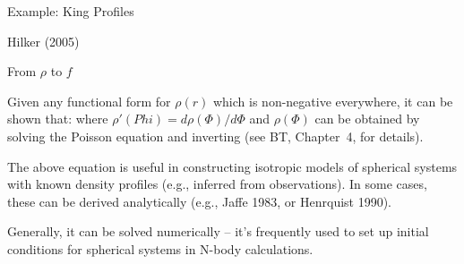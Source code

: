 \documentclass[letterpaper,landscape]{slides}
\begin{document}
\begin{slide}
\begin{center}
{\large \color{red} 
                  Example: King Profiles  }
\end{center}

\begin{center}
\vskip -0.0in
\end{center}

\begin{flushright}
Hilker (2005)
\end{flushright}

\vfill
\end{slide}


\begin{slide}
\begin{center}
{\large \color{red} 
                  From $\rho$ to $f$  }
\end{center}

Given any functional form for $\rho(r)$ which is non-negative everywhere, it can be shown
that:
where $\rho'(Phi) = d\rho(\Phi)/d\Phi$ and $\rho(\Phi)$ can be obtained by solving
the Poisson equation and inverting (see BT, Chapter~4, for details).

The above equation is useful in constructing isotropic models of spherical systems with
known density profiles (e.g., inferred from observations). In some cases,
these can be derived analytically (e.g., Jaffe 1983, or Henrquist 1990).

Generally, it can be solved numerically -- it's frequently used to set up
initial conditions for spherical systems in N-body calculations.

\vfill
\end{slide}
\end{document}
